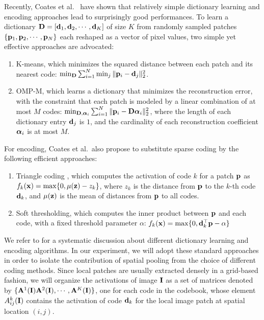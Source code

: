 Recently, Coates et al.~\cite{coates2011icml} have shown that relatively simple dictionary learning and encoding approaches lead to surprisingly good performances. To learn a dictionary $\mathbf{D} =[\mathbf{d}_1,\mathbf{d}_2,\cdots,\mathbf{d}_K]$ of size $K$ from randomly sampled patches $\{\mathbf{p}_1,\mathbf{p}_2,\cdots,\mathbf{p}_N\}$ each reshaped as a vector of pixel values, two simple yet effective approaches are advocated:
\begin{enumerate}
  \item K-means, which minimizes the squared distance between each patch and its nearest code: $\min_{\mathbf{D}} \sum_{i=1}^{N}\min_{j}\|\mathbf{p}_i - \mathbf{d}_j\|_2^2$.
  \item OMP-M, which learns a dictionary that minimizes the reconstruction error, with the constraint that each patch is modeled by a linear combination of at most $M$ codes: $\min_{\mathbf{D},\boldsymbol{\alpha}_{i}} \sum_{i=1}^{N}\|\mathbf{p}_i-\mathbf{D}\boldsymbol{\alpha}_i\|^{2}_{2}$, where the length of each dictionary entry $\mathbf{d}_j$ is $1$, and the cardinality of each reconstruction coefficient $\boldsymbol{\alpha}_i$ is at most $M$.
\end{enumerate}
For encoding, Coates et al.\ also propose to substitute sparse coding by the following efficient approaches:
\begin{enumerate}
  \item Triangle coding \cite{coates2010aistats}, which computes the activation of code $k$ for a patch $\mathbf{p}$ as $f_k(\mathbf{x}) = \max\{0,\mu(\mathbf{z}) - z_k\}$, where $z_k$ is the distance from $\mathbf{p}$ to the $k$-th code $\mathbf{d}_k$, and $\mu(\mathbf{z})$ is the mean of distances from $\mathbf{p}$ to all codes. 
  \item Soft thresholding, which computes the inner product between $\mathbf{p}$ and each code, with a fixed threshold parameter $\alpha$: $f_{k}(\mathbf{x}) = \max\{0, \mathbf{d}_k^\top\mathbf{p} - \alpha\}$
\end{enumerate}

We refer to \cite{coates2011icml} for a systematic discussion about different dictionary learning and encoding algorithms. In our experiment, we will adopt these standard approaches in order to isolate  the contribution of spatial pooling from the choice of different coding methods. Since local patches are usually extracted densely in a grid-based fashion, we will organize the activations of image $\mathbf{I}$ as a set of matrices denoted by $\{\mathbf{A}^{1}(\mathbf{I})\mathbf{A}^{2}(\mathbf{I}),\cdots,\mathbf{A}^{K}(\mathbf{I})\}$, one for each code in the codebook, whose element $A_{ij}^k(\mathbf{I})$ contains the activation of code $\mathbf{d}_k$ for the local image patch at spatial location $(i,j)$. 

